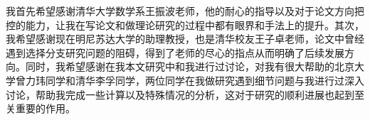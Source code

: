 

\begin{ack}


我首先希望感谢清华大学数学系王振波老师，他的耐心的指导以及对于论文方向把控的能力，让我在写论文和做理论研究的过程中都有眼界和手法上的提升。其次，我希望感谢现在明尼苏达大学的助理教授，也是清华校友王子卓老师，论文中曾经遇到选择分支研究问题的阻碍，得到了老师的尽心的指点从而明确了后续发展方向。同时，我希望感谢在我本文研究中和我进行过讨论，对我有很大帮助的北京大学曾力玮同学和清华李孚同学，两位同学在我做研究遇到细节问题与我进行过深入讨论，帮助我完成一些计算以及特殊情况的分析，这对于研究的顺利进展也起到至关重要的作用。


\end{ack}
